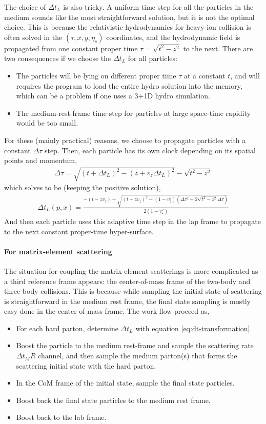 The choice of $\Delta t_L$ is also tricky. 
A uniform time step for all the particles in the medium sounds like the most straightforward solution, but it is not the optimal choice.
This is because the relativistic hydrodynamics for heavy-ion collision is often solved in the $(\tau,x,y,\eta_s)$ coordinates, and the hydrodynamic field is propagated from one constant proper time $\tau = \sqrt{t^2 - z^2}$ to the next.
There are two consequences if we choose the $\Delta t_L$ for all particles:
\begin{itemize}
\item The particles will be lying on different proper time $\tau$ at a constant $t$, and will requires the program to load the entire hydro solution into the memory, which can be a problem if one uses a 3+1D hydro simulation.
\item The medium-rest-frame time step for particles at large space-time rapidity would be too small. 
\end{itemize}
For these (mainly practical) reasons, we choose to propagate particles with a constant $\Delta \tau$ step. 
Then, each particle has its own clock depending on its spatial points and momentum,
\begin{eqnarray}
\Delta \tau = \sqrt{(t+\Delta t_L)^2 - (z+v_z \Delta t_L)^2} - \sqrt{t^2 - z^2}
\end{eqnarray}
which solves to be (keeping the positive solution),
\begin{eqnarray}
\Delta t_L(p, x) = \frac{-(t-z v_z) + \sqrt{(t-z v_z)^2 - (1-v_z^2)(\Delta \tau^2 + 2\sqrt{t^2 - z^2}\Delta \tau )}}{2(1-v_z^2)}
\label{eq:dt-transformation}
\end{eqnarray}
And then each particle uses this adaptive time step in the lap frame to propagate to the next constant proper-time hyper-surface.

\paragraph{For matrix-element scattering} The situation for coupling the matrix-element scatterings is more complicated as a third reference frame appears: the center-of-mass frame of the two-body and three-body collisions.
This is because while sampling the initial state of scattering is straightforward in the medium rest frame, the final state sampling is mostly easy done in the center-of-mass frame.
The work-flow proceed as,
\begin{itemize}
\item For each hard parton, determine $\Delta t_L$ with equation \ref{eq:dt-transformation}.
\item Boost the particle to the medium rest-frame and sample the scattering rate $\Delta t_M R$ channel, and then sample the medium parton(s) that forms the scattering initial state with the hard parton.
\item In the CoM frame of the initial state, sample the final state particles.
\item Boost back the final state particles to the medium rest frame.
\item Boost back to the lab frame.
\end{itemize}

